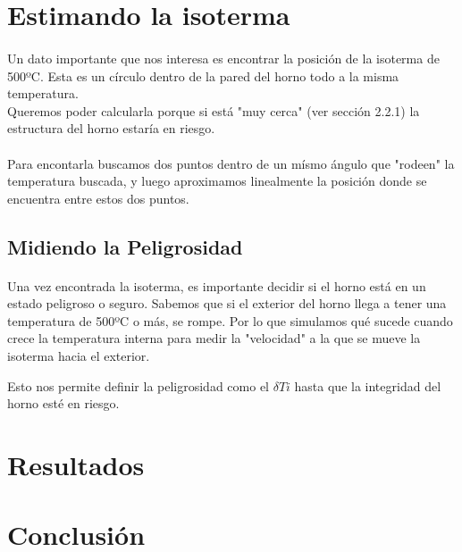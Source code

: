 \documentclass[12pt]{article}
\begin{document}

\section{Estimando la isoterma}

\paragraph{} Un dato importante que nos interesa es encontrar la posición de la isoterma de 500ºC. Esta es un círculo dentro de la pared del horno todo a la misma temperatura. \\
Queremos poder calcularla porque si está "muy cerca" (ver sección 2.2.1) la estructura del horno estaría en riesgo. %


\paragraph{} Para encontarla buscamos dos puntos dentro de un mísmo ángulo que "rodeen" la temperatura buscada, y luego aproximamos linealmente la posición donde se encuentra entre estos dos puntos.


\subsection{Midiendo la Peligrosidad}

\paragraph{} Una vez encontrada la isoterma, es importante decidir si el horno está en un estado peligroso o seguro. Sabemos que si el exterior del horno llega a tener una temperatura de 500ºC o más, se rompe. Por lo que simulamos qué sucede cuando crece la temperatura interna para medir la "velocidad" a la que se mueve la isoterma hacia el exterior.


Esto nos permite definir la peligrosidad como el \(\delta Ti\) hasta que la integridad del horno esté en riesgo.



\section{Resultados}


\section{Conclusión}

\end{document}
